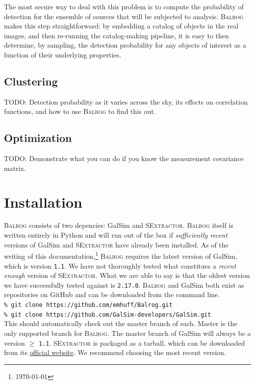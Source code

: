 \documentclass[12pt]{book}
\newcommand{\py}{Python}
\newcommand{\galsim}{GalSim}
\newcommand{\balrog}{\textsc{Balrog}}
\newcommand{\sex}{\textsc{SExtractor}}
\newcommand{\inline}{\\[0.4cm]}
\newcommand{\ericdate}{\mydate\today}
\begin{document}
The most secure way to deal with this problem is to compute the
probability of detection for the ensemble of sources that will be
subjected to analysis. \balrog{} makes this step straightforward: by
embedding a catalog of objects in the real images, and then re-running
the catalog-making pipeline, it is easy to then determine, by
sampling, the detection probability for any objects of interest as a
function of their underlying properties.


\section{Clustering}
TODO: Detection probability as it varies across the sky, its effects
on correlation functions, and how to use \balrog{} to find this out.

\section{Optimization}
TODO: Demonstrate what you can do if you know the measurement
covariance matrix.




\chapter{Installation}
\label{sec:install}

\balrog{} consists of two depencies: \galsim{} and \sex{}.
\balrog{} itself is written entirely in \py{} and will run out of the box if  
\emph{sufficiently recent} versions of \galsim{} and \sex{} have already been installed.
As of the writing of this documentation,\footnote{\label{foot:date}\ericdate} 
\balrog{} requires the latest version of \galsim{}, which is version \texttt{1.1}.
We have not thoroughly tested what constitues a \emph{recent enough} version of \sex{}.
What we are able to say is that the oldest version we have successfully tested against is \texttt{2.17.0}.
\balrog{} and \galsim{} both exist as repositories on GitHub and can be downloaded 
from the command line.
\inline
\texttt{\% git clone https://github.com/emhuff/Balrog.git} \\
\texttt{\% git clone https://github.com/GalSim-developers/GalSim.git}
\inline
This should automatically check out the master branch of each.
Master is the only supported branch for \balrog{}. 
The master branch of \galsim{} will always be a version $\geq$ \texttt{1.1}.
\sex{} is packaged as a tarball, which can be downloaded 
from its \href{https://www.astromatic.net/software/sextractor}{official website}.
We recommend choosing the most recent version.
\end{document}
